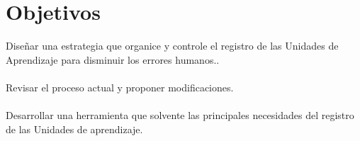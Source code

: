 \section{Objetivos}
Diseñar una estrategia que organice y controle el registro de las Unidades de Aprendizaje para disminuir los errores humanos..\\
\\
Revisar el proceso actual y proponer modificaciones.\\
\\
Desarrollar una herramienta que solvente las principales necesidades del registro de las Unidades de aprendizaje.\\
